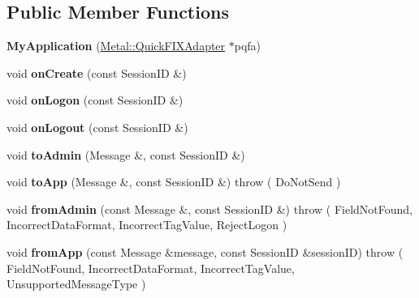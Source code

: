 \subsection*{Public Member Functions}
\begin{DoxyCompactItemize}
\item 
\hypertarget{classMyApplication_aa259a3d9d3d3d4e8740e5e9a625c79b7}{}{\bfseries My\+Application} (\hyperlink{classMetal_1_1QuickFIXAdapter}{Metal\+::\+Quick\+F\+I\+X\+Adapter} $\ast$pqfa)\label{classMyApplication_aa259a3d9d3d3d4e8740e5e9a625c79b7}

\item 
\hypertarget{classMyApplication_ad6150ac61d312580661934abf9b3ffb0}{}void {\bfseries on\+Create} (const Session\+I\+D \&)\label{classMyApplication_ad6150ac61d312580661934abf9b3ffb0}

\item 
\hypertarget{classMyApplication_ab703f8237b359c986cf0dbea6576fea7}{}void {\bfseries on\+Logon} (const Session\+I\+D \&)\label{classMyApplication_ab703f8237b359c986cf0dbea6576fea7}

\item 
\hypertarget{classMyApplication_a79669637862ccb3ae5707cfe731f0979}{}void {\bfseries on\+Logout} (const Session\+I\+D \&)\label{classMyApplication_a79669637862ccb3ae5707cfe731f0979}

\item 
\hypertarget{classMyApplication_af34f4f319806ceb09a27bb5f5306d7f2}{}void {\bfseries to\+Admin} (Message \&, const Session\+I\+D \&)\label{classMyApplication_af34f4f319806ceb09a27bb5f5306d7f2}

\item 
\hypertarget{classMyApplication_a46f565b9770b1e61ca44b023a404acfa}{}void {\bfseries to\+App} (Message \&, const Session\+I\+D \&)  throw ( Do\+Not\+Send )\label{classMyApplication_a46f565b9770b1e61ca44b023a404acfa}

\item 
\hypertarget{classMyApplication_a3cd73d38047f76ad847ec55390db6b19}{}void {\bfseries from\+Admin} (const Message \&, const Session\+I\+D \&)  throw ( Field\+Not\+Found, Incorrect\+Data\+Format, Incorrect\+Tag\+Value, Reject\+Logon )\label{classMyApplication_a3cd73d38047f76ad847ec55390db6b19}

\item 
\hypertarget{classMyApplication_a0f05d390feb06b3e756455a235ded3ed}{}void {\bfseries from\+App} (const Message \&message, const Session\+I\+D \&session\+I\+D)  throw ( Field\+Not\+Found, Incorrect\+Data\+Format, Incorrect\+Tag\+Value, Unsupported\+Message\+Type )\label{classMyApplication_a0f05d390feb06b3e756455a235ded3ed}


\end{DoxyCompactItemize}
